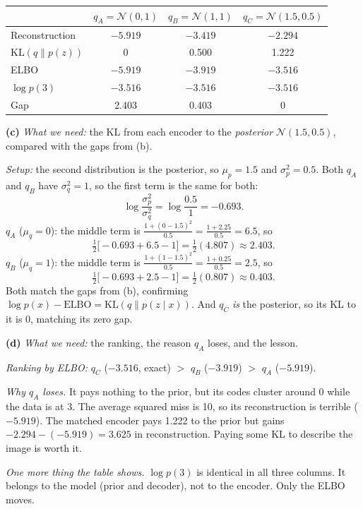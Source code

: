 \documentclass[12pt,a4paper]{article}
\begin{document}
\begin{center}
\begin{tabular}{@{}lccc@{}}
\toprule
 & $q_A=\mathcal{N}(0,1)$ & $q_B=\mathcal{N}(1,1)$ & $q_C=\mathcal{N}(1.5,0.5)$ \\
\midrule
Reconstruction & $-5.919$ & $-3.419$ & $-2.294$ \\
$\mathrm{KL}(q\|p(z))$ & 0 & 0.500 & 1.222 \\
ELBO & $-5.919$ & $-3.919$ & $-3.516$ \\
$\log p(3)$ & $-3.516$ & $-3.516$ & $-3.516$ \\
Gap & 2.403 & 0.403 & 0 \\
\bottomrule
\end{tabular}
\end{center}

\textbf{(c)} \emph{What we need:} the KL from each encoder to the \emph{posterior} $\mathcal{N}(1.5,0.5)$, compared with the gaps from (b).

\emph{Setup:} the second distribution is the posterior, so $\mu_p=1.5$ and $\sigma_p^2=0.5$. Both $q_A$ and $q_B$ have $\sigma_q^2=1$, so the first term is the same for both:
\[
\log\frac{\sigma_p^2}{\sigma_q^2}=\log\frac{0.5}{1}=-0.693 .
\]
\emph{$q_A$} ($\mu_q=0$): the middle term is $\frac{1+(0-1.5)^2}{0.5}=\frac{1+2.25}{0.5}=6.5$, so
\[
\tfrac12\big[-0.693+6.5-1\big]=\tfrac12(4.807)\approx2.403 .
\]
\emph{$q_B$} ($\mu_q=1$): the middle term is $\frac{1+(1-1.5)^2}{0.5}=\frac{1+0.25}{0.5}=2.5$, so
\[
\tfrac12\big[-0.693+2.5-1\big]=\tfrac12(0.807)\approx0.403 .
\]
Both match the gaps from (b), confirming $\log p(x)-\text{ELBO}=\mathrm{KL}(q\|p(z\mid x))$. And $q_C$ \emph{is} the posterior, so its KL to it is 0, matching its zero gap.

\textbf{(d)} \emph{What we need:} the ranking, the reason $q_A$ loses, and the lesson.

\emph{Ranking by ELBO:} $q_C$ ($-3.516$, exact) $>$ $q_B$ ($-3.919$) $>$ $q_A$ ($-5.919$).

\emph{Why $q_A$ loses.} It pays nothing to the prior, but its codes cluster around 0 while the data is at 3. The average squared miss is 10, so its reconstruction is terrible ($-5.919$). The matched encoder pays 1.222 to the prior but gains $-2.294-(-5.919)=3.625$ in reconstruction. Paying some KL to describe the image is worth it.

\emph{One more thing the table shows.} $\log p(3)$ is identical in all three columns. It belongs to the model (prior and decoder), not to the encoder. Only the ELBO moves.
\end{document}

